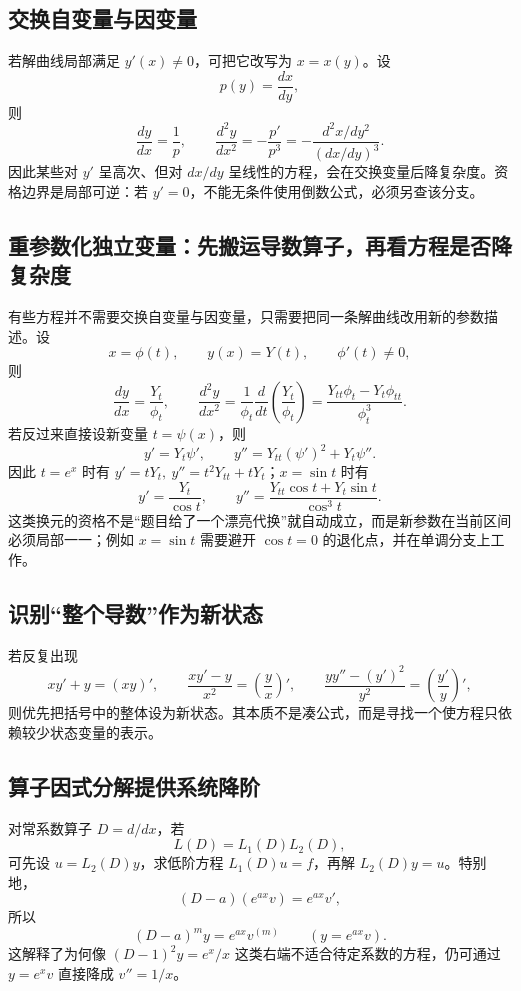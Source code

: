 \documentclass[11pt,a4paper,fontset=fandol]{ctexart}
\begin{document}
\subsection{交换自变量与因变量}

若解曲线局部满足 $y'(x)\ne0$，可把它改写为 $x=x(y)$。设
\[
p(y)=\frac{dx}{dy},
\]
则
\[
\frac{dy}{dx}=\frac1p,
\qquad
\frac{d^2y}{dx^2}=-\frac{p'}{p^3}
=-\frac{d^2x/dy^2}{(dx/dy)^3}.
\]
因此某些对 $y'$ 呈高次、但对 $dx/dy$ 呈线性的方程，会在交换变量后降复杂度。资格边界是局部可逆：若 $y'=0$，不能无条件使用倒数公式，必须另查该分支。

\subsection{重参数化独立变量：先搬运导数算子，再看方程是否降复杂度}

有些方程并不需要交换自变量与因变量，只需要把同一条解曲线改用新的参数描述。设
\[
x=\phi(t),\qquad y(x)=Y(t),\qquad \phi'(t)\ne0,
\]
则
\[
\frac{dy}{dx}=\frac{Y_t}{\phi_t},
\qquad
\frac{d^2y}{dx^2}
=\frac1{\phi_t}\frac d{dt}\left(\frac{Y_t}{\phi_t}\right)
=\frac{Y_{tt}\phi_t-Y_t\phi_{tt}}{\phi_t^3}.
\]
若反过来直接设新变量 $t=\psi(x)$，则
\[
y'=Y_t\psi',
\qquad
y''=Y_{tt}(\psi')^2+Y_t\psi''.
\]
因此 $t=e^x$ 时有 $y'=tY_t,\ y''=t^2Y_{tt}+tY_t$；$x=\sin t$ 时有
\[
y'=\frac{Y_t}{\cos t},
\qquad
y''=\frac{Y_{tt}\cos t+Y_t\sin t}{\cos^3 t}.
\]
这类换元的资格不是“题目给了一个漂亮代换”就自动成立，而是新参数在当前区间必须局部一一；例如 $x=\sin t$ 需要避开 $\cos t=0$ 的退化点，并在单调分支上工作。

\subsection{识别“整个导数”作为新状态}

若反复出现
\[
xy'+y=(xy)',
\qquad
\frac{xy'-y}{x^2}=\left(\frac yx\right)',
\qquad
\frac{yy''-(y')^2}{y^2}=\left(\frac{y'}y\right)',
\]
则优先把括号中的整体设为新状态。其本质不是凑公式，而是寻找一个使方程只依赖较少状态变量的表示。

\subsection{算子因式分解提供系统降阶}

对常系数算子 $D=d/dx$，若
\[
L(D)=L_1(D)L_2(D),
\]
可先设 $u=L_2(D)y$，求低阶方程 $L_1(D)u=f$，再解 $L_2(D)y=u$。特别地，
\[
(D-a)(e^{ax}v)=e^{ax}v',
\]
所以
\[
(D-a)^m y=e^{ax}v^{(m)}\qquad (y=e^{ax}v).
\]
这解释了为何像 $(D-1)^2y=e^x/x$ 这类右端不适合待定系数的方程，仍可通过 $y=e^xv$ 直接降成 $v''=1/x$。
\end{document}
